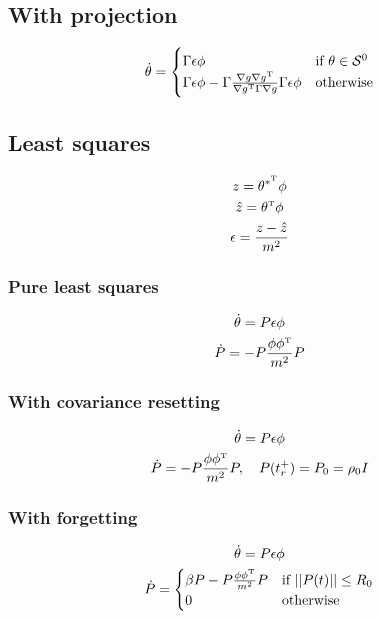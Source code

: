 \subsection{With projection}
\begin{gather}
	\dot{\theta} =
	\begin{cases}
		\Gamma \epsilon \phi & \mbox{if } \theta \in \mathcal{S}^0 \\
		\Gamma \epsilon \phi - \Gamma \frac{\nabla g \nabla g^{\scriptscriptstyle \mathrm{T}}}{\nabla g^{\scriptscriptstyle \mathrm{T}} \Gamma \nabla g} \Gamma \epsilon \phi & \mbox{otherwise}
	\end{cases}
\end{gather}

\subsection{Least squares}
\begin{gather}
	z = \theta^{*^{\scriptscriptstyle \mathrm{T}}} \phi \\
	\hat{z} = \theta^{\scriptscriptstyle \mathrm{T}} \phi \\
	\epsilon = \frac{z - \hat{z}}{m^2}
\end{gather}

\subsubsection{Pure least squares}
\begin{gather}
	\dot{\theta} = P \epsilon \phi \\
	\dot{P} = - P \frac{\phi \phi^{\scriptscriptstyle \mathrm{T}}}{m^2} P
\end{gather}

\subsubsection{With covariance resetting}
\begin{gather}
	\dot{\theta} = P \epsilon \phi \\
	\dot{P} = - P \frac{\phi \phi^{\scriptscriptstyle \mathrm{T}}}{m^2} P, \quad P(t_r^+) = P_0 = \rho_0 I
\end{gather}

\subsubsection{With forgetting}
\begin{gather}
	\dot{\theta} = P \epsilon \phi \\
	\dot{P} =
	\begin{cases}
		\beta P - P \frac{\phi \phi^{\scriptscriptstyle \mathrm{T}}}{m^2} P & \mbox{if } ||P(t)|| \leq R_0 \\
		0                                     & \mbox{otherwise}
	\end{cases}
\end{gather}